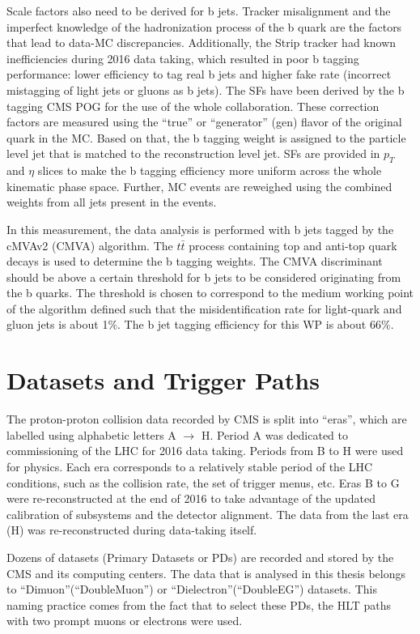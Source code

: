 Scale factors also need to be derived for b jets. Tracker misalignment and the imperfect knowledge of the hadronization process of the b quark are the factors that lead to data-MC discrepancies. Additionally, the Strip tracker had known inefficiencies during 2016 data taking, which resulted in poor b tagging performance: lower efficiency to tag real b jets and higher fake rate (incorrect mistagging of light jets or gluons as b jets). The SFs have been derived by the b tagging CMS POG for the use of the whole collaboration. These correction factors are measured using the ``true'' or ``generator'' (gen) flavor of the original quark in the MC. Based on that, the b tagging weight is assigned to the particle level jet that is matched to the reconstruction level jet. SFs are provided in $p_T$ and $\eta$ slices to make the b tagging efficiency more uniform across the whole kinematic phase space. Further, MC events are reweighed using the combined weights from all jets present in the events. 

In this measurement, the data analysis is performed with b jets tagged by the cMVAv2 (CMVA) algorithm. The $t\bar{t}$ process containing top and anti-top quark decays is used to determine the b tagging weights. The CMVA discriminant should be above a certain threshold for b jets to be considered originating from the b quarks. The threshold is chosen to correspond to the medium working point of the algorithm defined such that the misidentification rate for light-quark and gluon jets is about 1$\%$.  The b jet tagging efficiency for this WP is about 66$\%$.


\section{Datasets and Trigger Paths}\label{sec:data_and_trigger}

The proton-proton collision data recorded by CMS is split into ``eras'', which are labelled using alphabetic letters A $\rightarrow $ H. Period A was dedicated to commissioning of the LHC for 2016 data taking. Periods from B to H were used for physics. Each era corresponds to a relatively stable period of the LHC conditions, such as the collision rate, the set of trigger menus, etc. Eras B to G were re-reconstructed at the end of 2016 to take advantage of the updated calibration of subsystems and the detector alignment. The data from the last era (H) was re-reconstructed during data-taking itself. 

Dozens of datasets (Primary Datasets or PDs) are recorded and stored by the CMS and its computing centers. The data that is analysed in this thesis belongs to ``Dimuon''(``DoubleMuon'') or ``Dielectron''(``DoubleEG'') datasets. This naming practice comes from the fact that to select these PDs, the HLT paths with two prompt muons or electrons were used. 

